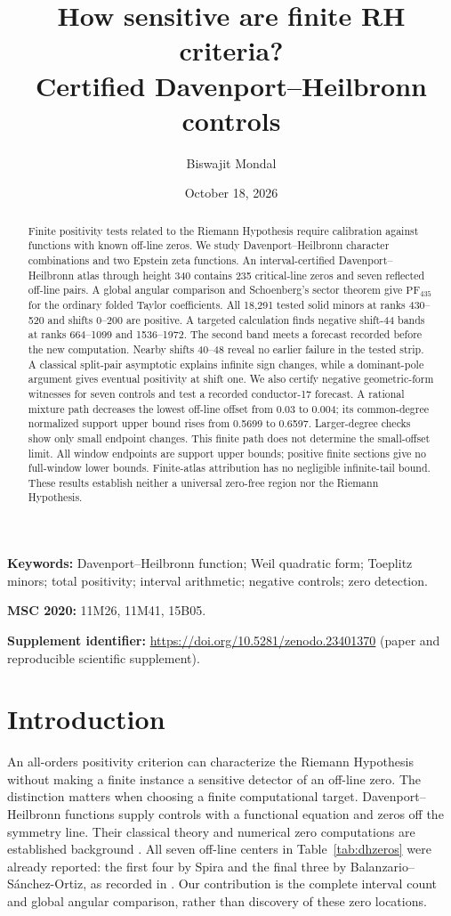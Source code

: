 \documentclass[11pt]{article}
\title{\bfseries How sensitive are finite RH criteria?\\Certified Davenport--Heilbronn controls}
\author{Biswajit Mondal}
\date{October 18, 2026}
\theoremstyle{remark}
\newcommand{\PF}{\mathrm{PF}}
\begin{document}
\maketitle
\begin{abstract}
Finite positivity tests related to the Riemann Hypothesis require calibration
against functions with known off-line zeros. We study Davenport--Heilbronn
character combinations and two Epstein zeta functions. An interval-certified
Davenport--Heilbronn atlas through height 340 contains 235 critical-line zeros
and seven reflected off-line pairs. A global angular comparison and
Schoenberg's sector theorem give \(\PF_{435}\) for the ordinary folded
Taylor coefficients. All 18,291 tested solid minors at ranks 430--520 and
shifts 0--200 are positive. A targeted calculation finds negative shift-44
bands at ranks 664--1099 and 1536--1972. The second band meets a forecast
recorded before the new computation. Nearby shifts 40--48 reveal no earlier
failure in the tested strip. A classical split-pair asymptotic explains
infinite sign changes, while a dominant-pole argument gives eventual
positivity at shift one. We also certify negative geometric-form witnesses
for seven controls and test a recorded conductor-17 forecast. A rational
mixture path decreases the lowest off-line offset from 0.03 to 0.004; its
common-degree normalized support upper bound rises from 0.5699 to 0.6597.
Larger-degree checks show only small endpoint changes. This finite path
does not determine the small-offset limit. All window endpoints are support
upper bounds; positive finite sections give no full-window lower bounds.
Finite-atlas attribution has no negligible infinite-tail bound. These
results establish neither a universal zero-free region nor the Riemann
Hypothesis.
\end{abstract}
\noindent\textbf{Keywords:} Davenport--Heilbronn function; Weil quadratic form;
Toeplitz minors; total positivity; interval arithmetic; negative controls;
zero detection.

\noindent\textbf{MSC 2020:} 11M26, 11M41, 15B05.

\noindent\textbf{Supplement identifier:} \url{https://doi.org/10.5281/zenodo.23401370}
(paper and reproducible scientific supplement).

\section{Introduction}
An all-orders positivity criterion can characterize the Riemann Hypothesis
without making a finite instance a sensitive detector of an off-line zero.
The distinction matters when choosing a finite computational target.
Davenport--Heilbronn functions supply controls with a functional equation and
zeros off the symmetry line. Their classical theory and numerical zero
computations are established background
\cite{dh1936,balanzario2007,bombieriGhosh2011}.
All seven off-line centers in Table~\ref{tab:dhzeros} were already reported:
the first four by Spira and the final three by Balanzario--S\'anchez-Ortiz,
as recorded in \cite{balanzario2007}. Our contribution is the complete
interval count and global angular comparison, rather than discovery of
these zero locations.
\end{document}
